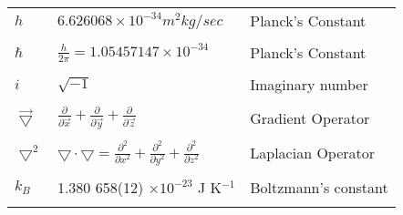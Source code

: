 \begin{tabular}{p{1.2in}p{2.5in}p{2.5in}}

$h$ & $6.626068 \times 10 ^ {-34} m^2kg/sec$ & Planck's Constant \\ \\

$\hbar$ & $\frac h {2 \pi} = 1.05457147 \times 10 ^ {-34}$ & 
          Planck's Constant \\ \\

$i$ & $\sqrt{-1}$ & Imaginary number \\ \\

$\vec{\bigtriangledown}$ & $\frac{\partial}{\partial \vec{x}} +
\frac{\partial}{\partial \vec{y}} + \frac {\partial}{\partial \vec{z}}$ &
Gradient Operator \\ \\

$\bigtriangledown^2$ & $\bigtriangledown \cdot \bigtriangledown = \frac
{\partial ^2} {\partial x ^2} + \frac {\partial ^2} {\partial y^2} + \frac
{\partial ^2} {\partial z ^2}$ & Laplacian Operator \\ \\

$k_B$ & 1.380 658(12) $\times 10 ^ {-23}$ J K$^{-1}$ &
Boltzmann's constant \cite{CRC_Book} \\ \\

\end{tabular}
